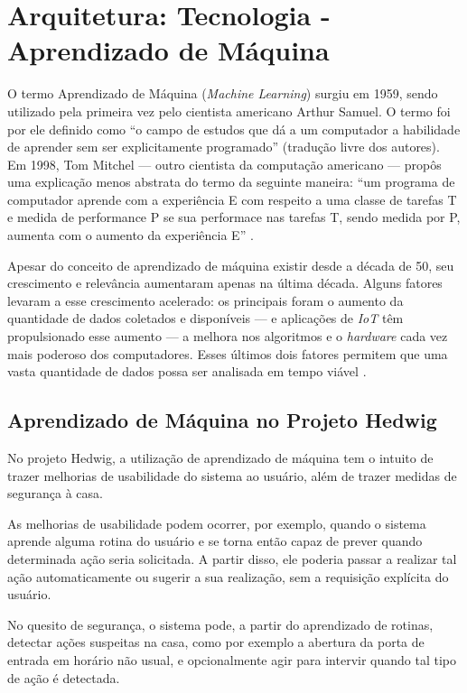 \chapter{Arquitetura: Tecnologia - Aprendizado de Máquina}

	O termo Aprendizado de Máquina (\emph{Machine Learning}) surgiu em 1959, sendo utilizado pela primeira vez  pelo cientista americano Arthur Samuel. O termo foi por ele definido como ``o campo de estudos que dá a um computador a habilidade de aprender sem ser explicitamente programado'' (tradução livre dos autores). Em 1998, Tom Mitchel --- outro cientista da computação americano --- propôs uma explicação menos abstrata do termo da seguinte maneira: ``um programa de computador aprende com a experiência E com respeito a uma classe de tarefas T e medida de performance P se sua performace nas tarefas T, sendo medida por P, aumenta com o aumento da experiência E'' \cite{Coursera}.

	Apesar do conceito de aprendizado de máquina existir desde a década de 50, seu crescimento e relevância aumentaram apenas na última década. Alguns fatores levaram a esse crescimento acelerado: os principais foram o aumento da quantidade de dados coletados e disponíveis --- e aplicações de \emph{IoT} têm propulsionado esse aumento --- a melhora nos algoritmos e o \emph{hardware} cada vez mais poderoso dos computadores. Esses últimos dois fatores permitem que uma vasta quantidade de dados possa ser analisada em tempo viável \cite{hbrMlExplosion}.

	\section{Aprendizado de Máquina no Projeto Hedwig}\label{aprendizadoDeMaquinaNoProjetoHedwig}

		No projeto Hedwig, a utilização de aprendizado de máquina tem o intuito de trazer melhorias de usabilidade do sistema ao usuário, além de trazer medidas de segurança à casa.

		As melhorias de usabilidade podem ocorrer, por exemplo, quando o sistema aprende alguma rotina do usuário e se torna então capaz de prever quando determinada ação seria solicitada. A partir disso, ele poderia passar a realizar tal ação automaticamente ou sugerir a sua realização, sem a requisição explícita do usuário.

		No quesito de segurança, o sistema pode, a partir do aprendizado de rotinas, detectar ações suspeitas na casa, como por exemplo a abertura da porta de entrada em horário não usual, e opcionalmente agir para intervir quando tal tipo de ação é detectada.

